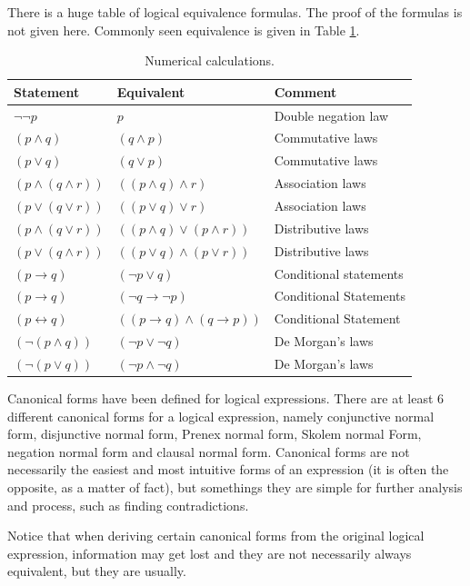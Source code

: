 There is a huge table of logical equivalence formulas. The proof of the formulas is not given here. Commonly seen equivalence is given in Table \ref{tab:logicalequivalence}.

\begin{table}
	\centering \caption{Numerical calculations.} \label{tab:logicalequivalence}
	\begin{tabularx}{\textwidth}{llX}
		\hline
		Statement & Equivalent & Comment \\
		\hline
		$\neg \neg p$ & $p$ & Double negation law \\
		$(p \land q)$ & $(q \land p)$ & Commutative laws \\
		$(p \lor q)$ & $(q \lor p)$ & Commutative laws \\
		$(p \land (q \land r))$ & $((p \land q) \land r)$ & Association laws \\
		$(p \lor (q \lor r))$ & $((p \lor q) \lor r)$ & Association laws \\
		$(p \land (q \lor r))$ & $((p \land q) \lor (p \land r))$ & Distributive laws \\
		$(p \lor (q \land r))$ & $((p \lor q) \land (p \lor r))$ & Distributive laws \\
		$(p \rightarrow q)$ & $(\neg p \lor q)$ & Conditional statements \\
		$(p \rightarrow q)$ & $(\neg q \rightarrow \neg p)$ & Conditional Statements \\
		$(p \leftrightarrow q)$ & $((p \rightarrow q) \land (q \rightarrow p))$ & Conditional Statement \\
		$(\neg (p \land q))$ & $(\neg p \lor \neg q)$ & De Morgan's laws \\
		$(\neg (p \lor q))$ & $(\neg p \land \neg q)$ & De Morgan's laws \\
		\hline
	\end{tabularx}
\end{table}

Canonical forms have been defined for logical expressions. There are at least 6 different canonical forms for a logical expression, namely conjunctive normal form, disjunctive normal form, Prenex normal form, Skolem normal Form, negation normal form and clausal normal form. Canonical forms are not necessarily the easiest and most intuitive forms of an expression (it is often the opposite, as a matter of fact), but somethings they are simple for further analysis and process, such as finding contradictions.

Notice that when deriving certain canonical forms from the original logical expression, information may get lost and they are not necessarily always equivalent, but they are usually.

